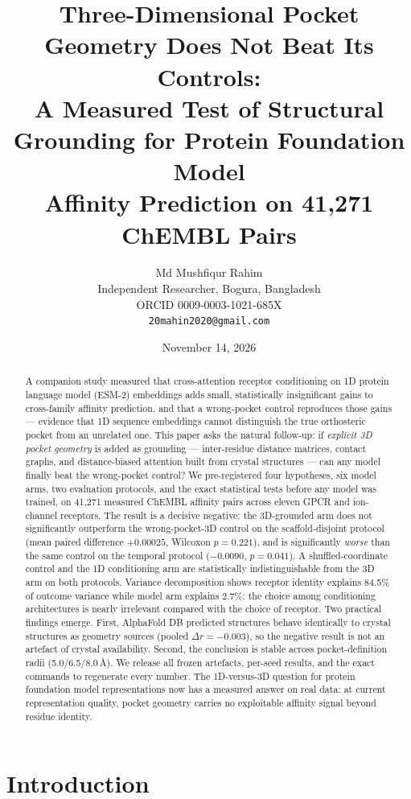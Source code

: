 \documentclass[11pt]{article}
\title{\textbf{Three-Dimensional Pocket Geometry Does Not Beat Its Controls:\\
A Measured Test of Structural Grounding for Protein Foundation Model\\
Affinity Prediction on 41{,}271 ChEMBL Pairs}}
\author{Md Mushfiqur Rahim\\
Independent Researcher, Bogura, Bangladesh\\
ORCID 0009-0003-1021-685X\\
\texttt{20mahin2020@gmail.com}}
\date{November 14, 2026}
\begin{document}
\maketitle

\begin{abstract}
A companion study measured that cross-attention receptor conditioning on 1D
protein language model (ESM-2) embeddings adds small, statistically
insignificant gains to cross-family affinity prediction, and that a
wrong-pocket control reproduces those gains --- evidence that 1D sequence
embeddings cannot distinguish the true orthosteric pocket from an unrelated
one. This paper asks the natural follow-up: if \emph{explicit 3D pocket
geometry} is added as grounding --- inter-residue distance matrices, contact
graphs, and distance-biased attention built from crystal structures --- can
any model finally beat the wrong-pocket control? We pre-registered four
hypotheses, six model arms, two evaluation protocols, and the exact
statistical tests before any model was trained, on 41{,}271 measured
ChEMBL affinity pairs across eleven GPCR and ion-channel receptors. The
result is a decisive negative: the 3D-grounded arm does not significantly
outperform the wrong-pocket-3D control on the scaffold-disjoint protocol
(mean paired difference $+0.00025$, Wilcoxon $p=0.221$), and is
significantly \emph{worse} than the same control on the temporal protocol
($-0.0090$, $p=0.041$). A shuffled-coordinate control and the 1D
conditioning arm are statistically indistinguishable from the 3D arm on
both protocols. Variance decomposition shows receptor identity explains
84.5\% of outcome variance while model arm explains 2.7\%: the choice
among conditioning architectures is nearly irrelevant compared with the
choice of receptor. Two practical findings emerge. First, AlphaFold DB
predicted structures behave identically to crystal structures as geometry
sources (pooled $\Delta r=-0.003$), so the negative result is not an
artefact of crystal availability. Second, the conclusion is stable across
pocket-definition radii (5.0/6.5/8.0\,\AA). We release all frozen
artefacts, per-seed results, and the exact commands to regenerate every
number. The 1D-versus-3D question for protein foundation model
representations now has a measured answer on real data: at current
representation quality, pocket geometry carries no exploitable affinity
signal beyond residue identity.
\end{abstract}

\section{Introduction}
\end{document}
